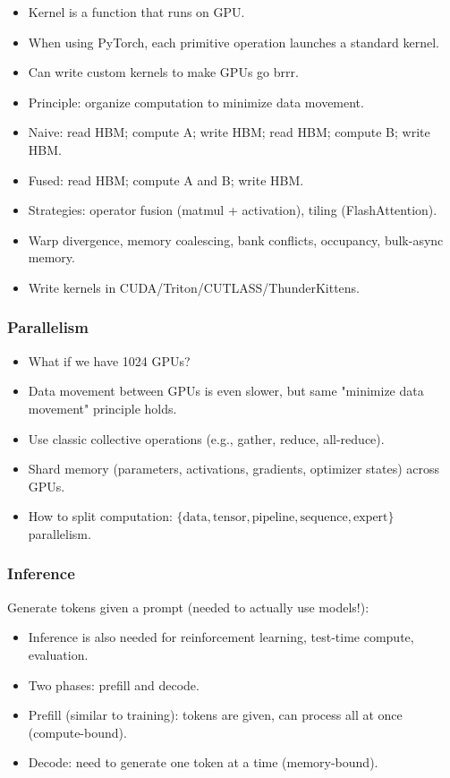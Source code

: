 \documentclass[12pt,twoside]{article}
\begin{document}
\begin{itemize}
    \item Kernel is a function that runs on GPU.
    \item When using PyTorch, each primitive operation launches a standard kernel.
    \item Can write custom kernels to make GPUs go brrr.
    \item Principle: organize computation to minimize data movement.
    \item Naive: read HBM; compute A; write HBM; read HBM; compute B; write HBM.
    \item Fused: read HBM; compute A and B; write HBM.
    \item Strategies: operator fusion (matmul + activation), tiling (FlashAttention).
    \item Warp divergence, memory coalescing, bank conflicts, occupancy, bulk-async memory.
    \item Write kernels in CUDA/Triton/CUTLASS/ThunderKittens.
\end{itemize}

\subsubsection*{Parallelism}

\begin{itemize}
    \item What if we have 1024 GPUs?
    \item Data movement between GPUs is even slower, but same "minimize data movement" principle holds.
    \item Use classic collective operations (e.g., gather, reduce, all-reduce).
    \item Shard memory (parameters, activations, gradients, optimizer states) across GPUs.
    \item How to split computation: \(\{\text{data}, \text{tensor}, \text{pipeline}, \text{sequence}, \text{expert}\}\) parallelism.
\end{itemize}

\subsubsection*{Inference}

Generate tokens given a prompt (needed to actually use models!):

\begin{itemize}
    \item Inference is also needed for reinforcement learning, test-time compute, evaluation.
    \item Two phases: prefill and decode.
    \item Prefill (similar to training): tokens are given, can process all at once (compute-bound).
    \item Decode: need to generate one token at a time (memory-bound).
\end{itemize}
\end{document}
